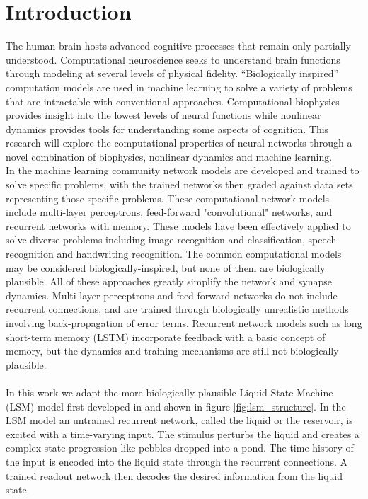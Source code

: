 \documentclass[a4paper,11pt]{article}
\begin{document}
\section{Introduction} 
 The human brain hosts advanced cognitive processes that remain only partially understood.
Computational neuroscience seeks to understand brain functions through modeling at several levels of physical fidelity.
``Biologically inspired'' computation models are used in machine learning to solve a variety of problems that are intractable with conventional approaches.
Computational biophysics provides insight into the lowest levels of neural functions while nonlinear dynamics provides tools for understanding some aspects of cognition.
This research will explore the computational properties of neural networks through a novel combination of biophysics, nonlinear dynamics and machine learning.
\\
In the machine learning community network models are developed and trained to solve specific problems, with the trained networks then graded against data sets representing those specific problems.
These computational network models include multi-layer perceptrons, feed-forward "convolutional" networks, and recurrent networks with memory.
These models have been effectively applied to solve diverse problems including image recognition and classification, speech recognition and handwriting recognition.
The common computational models may be considered biologically-inspired, but none of them are biologically plausible.
All of these approaches greatly simplify the network and synapse dynamics.
Multi-layer perceptrons and feed-forward networks do not include recurrent connections, and are trained through biologically unrealistic methods involving back-propagation of error terms.
Recurrent network models such as long short-term memory (LSTM)  incorporate feedback with a basic concept of memory, but the dynamics and training mechanisms are still not biologically plausible. \\
\\
In this work we adapt the more biologically plausible Liquid State Machine (LSM) model first developed in \cite{maas2002} and shown in figure \ref{fig:lsm_structure}.
In the LSM model an untrained recurrent network, called the liquid or the reservoir, is excited with a time-varying input.
The stimulus perturbs the liquid and creates a complex state progression like pebbles dropped into a pond.
The time history of the input is encoded into the liquid state through the recurrent connections.
A trained readout network then decodes the desired information from the liquid state. 
\end{document}
